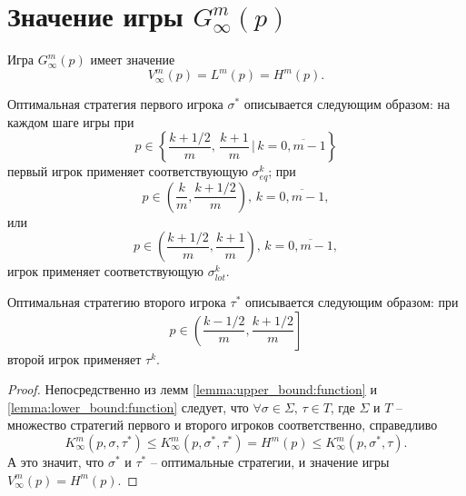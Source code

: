 \section{Значение игры $ G_\infty^m(p) $}
\begin{thm}
\label{thm:infinite_game:value}
Игра $ G_\infty^m(p) $ имеет значение 
\[
V_\infty^m(p) = L^m(p) = H^m(p).
\]

Оптимальная стратегия первого игрока $ \sigma^* $ описывается следующим образом: на каждом шаге игры при 
\[
  p \in \left\{
    \frac{k+1/2}{m}, \, \frac{k+1}{m} \,|\, k = \overline{0, m-1}
  \right\}
\]
первый игрок применяет соответствующую $ \sigma^k_{eq} $; при
\[
  p \in \left(
    \frac{k}{m}, \frac{k+1/2}{m}
  \right),\,
  k = \overline{0, m-1},
\]
или
\[
  p \in \left(
    \frac{k+1/2}{m}, \frac{k+1}{m}
  \right),\,
  k = \overline{0, m-1},
\]
игрок применяет соответствующую $ \sigma^k_{lot} $.

Оптимальная стратегию второго игрока $ \tau^* $ описывается следующим образом: при
\[
  p \in \left(
    \frac{k-1/2}{m}, \frac{k+1/2}{m}
  \right]
\]
второй игрок применяет $ \tau^k $.
\end{thm}
\begin{proof}
Непосредственно из лемм \ref{lemma:upper_bound:function} и \ref{lemma:lower_bound:function} следует, что
$ \forall \sigma \in \Sigma, \, \tau \in T $, где $ \Sigma $ и $ T $ -- множество стратегий первого и второго игроков соответственно, справедливо
\[
  K_\infty^m(p, \sigma, \tau^*)
\leq K_\infty^m(p, \sigma^*, \tau^*) = H^m(p) \leq 
  K_\infty^m(p, \sigma^*, \tau).
\]
А это значит, что $ \sigma^* $ и $ \tau^* $ -- оптимальные стратегии, и значение игры $ V_\infty^m(p) = H^m(p) $.
\end{proof}
